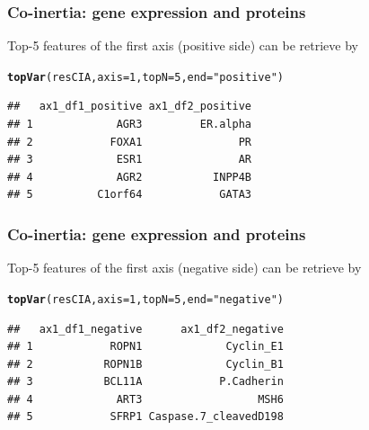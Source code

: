 \documentclass[10pt,xcolor=dvipsnames]{beamer}\usepackage[]{graphicx}\usepackage[]{color}
\makeatletter
\newcommand{\hlnum}[1]{\textcolor[rgb]{0.686,0.059,0.569}{#1}}%
\newcommand{\hlstr}[1]{\textcolor[rgb]{0.192,0.494,0.8}{#1}}%
\newcommand{\hlstd}[1]{\textcolor[rgb]{0.345,0.345,0.345}{#1}}%
\newcommand{\hlkwc}[1]{\textcolor[rgb]{0.333,0.667,0.333}{#1}}%
\newcommand{\hlkwd}[1]{\textcolor[rgb]{0.737,0.353,0.396}{\textbf{#1}}}%
\newenvironment{kframe}{%
 \def\at@end@of@kframe{}%
 \ifinner\ifhmode%
  \def\at@end@of@kframe{\end{minipage}}%
  \begin{minipage}{\columnwidth}%
 \fi\fi%
 \def\FrameCommand##1{\hskip\@totalleftmargin \hskip-\fboxsep
 \colorbox{shadecolor}{##1}\hskip-\fboxsep
     \hskip-\linewidth \hskip-\@totalleftmargin \hskip\columnwidth}%
 \MakeFramed {\advance\hsize-\width
   \@totalleftmargin\z@ \linewidth\hsize
   \@setminipage}}%
 {\par\unskip\endMakeFramed%
 \at@end@of@kframe}
\newenvironment{knitrout}{}{} %
\makeatother
\begin{document}
\begin{frame}\frametitle{Co-inertia: gene expression and proteins}

Top-5 features of the first axis (positive side) can be retrieve by

\footnotesize
\begin{knitrout}\footnotesize
{}\color{fgcolor}\begin{kframe}
\begin{alltt}
\hlkwd{topVar}\hlstd{(resCIA,} \hlkwc{axis}\hlstd{=}\hlnum{1}\hlstd{,} \hlkwc{topN}\hlstd{=}\hlnum{5}\hlstd{,} \hlkwc{end}\hlstd{=}\hlstr{"positive"}\hlstd{)}
\end{alltt}
\begin{verbatim}
##   ax1_df1_positive ax1_df2_positive
## 1             AGR3         ER.alpha
## 2            FOXA1               PR
## 3             ESR1               AR
## 4             AGR2           INPP4B
## 5          C1orf64            GATA3
\end{verbatim}
\end{kframe}
\end{knitrout}

\end{frame}



\begin{frame}\frametitle{Co-inertia: gene expression and proteins}

Top-5 features of the first axis (negative side) can be retrieve by

\footnotesize
\begin{knitrout}\footnotesize
{}\color{fgcolor}\begin{kframe}
\begin{alltt}
\hlkwd{topVar}\hlstd{(resCIA,} \hlkwc{axis}\hlstd{=}\hlnum{1}\hlstd{,} \hlkwc{topN}\hlstd{=}\hlnum{5}\hlstd{,} \hlkwc{end}\hlstd{=}\hlstr{"negative"}\hlstd{)}
\end{alltt}
\begin{verbatim}
##   ax1_df1_negative      ax1_df2_negative
## 1            ROPN1             Cyclin_E1
## 2           ROPN1B             Cyclin_B1
## 3           BCL11A            P.Cadherin
## 4             ART3                  MSH6
## 5            SFRP1 Caspase.7_cleavedD198
\end{verbatim}
\end{kframe}
\end{knitrout}

\end{frame}
\end{document}
